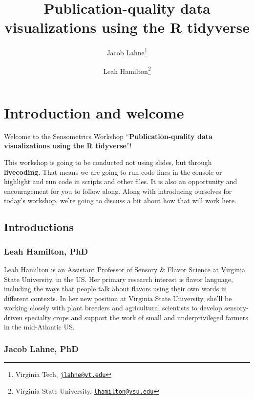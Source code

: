 \documentclass[
]{book}
\title{Publication-quality data visualizations using the R tidyverse}
\author{Jacob Lahne\footnote{Virginia Tech, \href{mailto:jlahne@vt.edu}{\nolinkurl{jlahne@vt.edu}}} \and Leah Hamilton\footnote{Virginia State University, \href{mailto:lhamilton@vsu.edu}{\nolinkurl{lhamilton@vsu.edu}}}}
\date{}
\begin{document}
\maketitle

{
\setcounter{tocdepth}{1}
\tableofcontents
}
\hypertarget{introduction-and-welcome}{%
\chapter*{Introduction and welcome}\label{introduction-and-welcome}}

Welcome to the Sensometrics Workshop ``\textbf{Publication-quality data visualizations using the R tidyverse}''!

This workshop is going to be conducted not using slides, but through \textbf{livecoding}. That means we are going to run code lines in the console or highlight and run code in scripts and other files. It is also an opportunity and encouragement for you to follow along. Along with introducing ourselves for today's workshop, we're going to discuss a bit about how that will work here.

\hypertarget{introductions}{%
\section*{Introductions}\label{introductions}}

\hypertarget{leah-hamilton-phd}{%
\subsection*{Leah Hamilton, PhD}\label{leah-hamilton-phd}}

Leah Hamilton is an Assistant Professor of Sensory \& Flavor Science at Virginia State University, in the US. Her primary research interest is flavor language, including the ways that people talk about flavors using their own words in different contexts. In her new position at Virginia State University, she'll be working closely with plant breeders and agricultural scientists to develop sensory-driven specialty crops and support the work of small and underprivileged farmers in the mid-Atlantic US.

\hypertarget{jacob-lahne-phd}{%
\subsection*{Jacob Lahne, PhD}\label{jacob-lahne-phd}}
\end{document}
